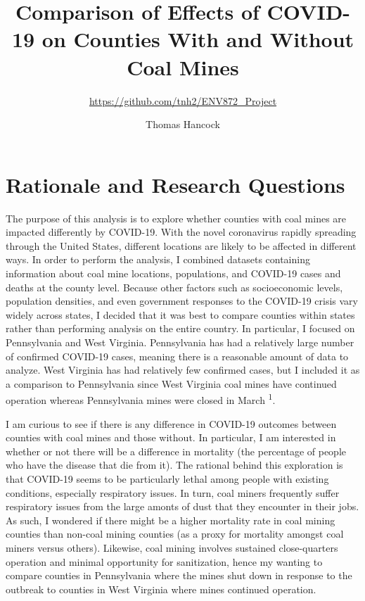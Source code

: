 \documentclass[
  12pt,
]{article}
\title{Comparison of Effects of COVID-19 on Counties With and Without Coal
Mines}
\subtitle{\url{https://github.com/tnh2/ENV872_Project}}
\author{Thomas Hancock}
\date{}
\begin{document}
\maketitle

\newpage
\tableofcontents 
\newpage
\listoftables 
\newpage
\listoffigures 
\newpage

\hypertarget{rationale-and-research-questions}{%
\section{Rationale and Research
Questions}\label{rationale-and-research-questions}}

The purpose of this analysis is to explore whether counties with coal
mines are impacted differently by COVID-19. With the novel coronavirus
rapidly spreading through the United States, different locations are
likely to be affected in different ways. In order to perform the
analysis, I combined datasets containing information about coal mine
locations, populations, and COVID-19 cases and deaths at the county
level. Because other factors such as socioeconomic levels, population
densities, and even government responses to the COVID-19 crisis vary
widely across states, I decided that it was best to compare counties
within states rather than performing analysis on the entire country. In
particular, I focused on Pennsylvania and West Virginia. Pennsylvania
has had a relatively large number of confirmed COVID-19 cases, meaning
there is a reasonable amount of data to analyze. West Virginia has had
relatively few confirmed cases, but I included it as a comparison to
Pennsylvania since West Virginia coal mines have continued operation
whereas Pennsylvania mines were closed in March \textsuperscript{1}.

I am curious to see if there is any difference in COVID-19 outcomes
between counties with coal mines and those without. In particular, I am
interested in whether or not there will be a difference in mortality
(the percentage of people who have the disease that die from it). The
rational behind this exploration is that COVID-19 seems to be
particularly lethal among people with existing conditions, especially
respiratory issues. In turn, coal miners frequently suffer respiratory
issues from the large amonts of dust that they encounter in their jobs.
As such, I wondered if there might be a higher mortality rate in coal
mining counties than non-coal mining counties (as a proxy for mortality
amongst coal miners versus others). Likewise, coal mining involves
sustained close-quarters operation and minimal opportunity for
sanitization, hence my wanting to compare counties in Pennsylvania where
the mines shut down in response to the outbreak to counties in West
Virginia where mines continued operation.
\end{document}

